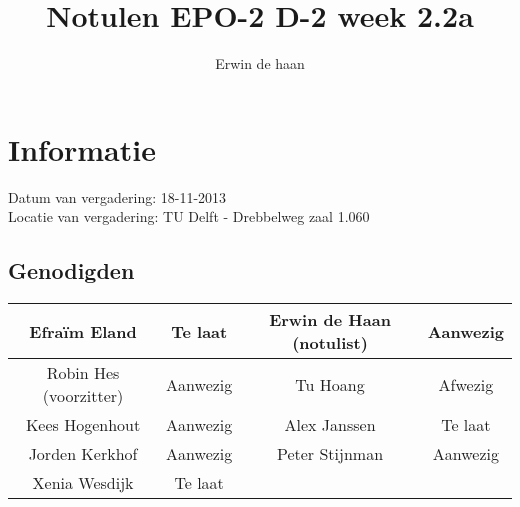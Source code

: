 \documentclass{article}
\begin{document}
\title{Notulen EPO-2 D-2 week 2.2a }%
\author{Erwin de haan}%
\maketitle

\section*{Informatie}
Datum van vergadering: 18-11-2013 \\ %
Locatie van vergadering: TU Delft - Drebbelweg zaal 1.060 %
\subsection*{Genodigden}
\begin{center}
\begin{tabular}{|c |c | c| c|}
	\hline
Efraïm Eland & Te laat & Erwin de Haan (notulist) & Aanwezig \\
	\hline
Robin Hes (voorzitter) & Aanwezig & Tu Hoang & Afwezig \\
	\hline
Kees Hogenhout & Aanwezig & Alex Janssen & Te laat\\
	\hline
Jorden Kerkhof & Aanwezig & Peter Stijnman & Aanwezig \\
	\hline
Xenia Wesdijk & Te laat & & \\
	\hline
\end{tabular}
\end{center}
\end{document}
